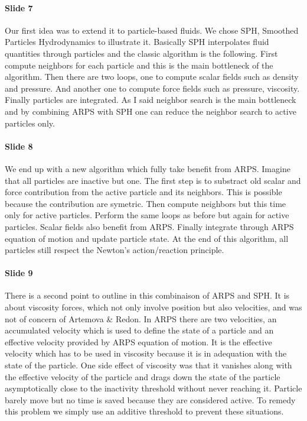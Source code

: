 \documentclass[twocolumn]{article}
\begin{document}
\paragraph{Slide 7}
Our first idea was to extend it to particle-based fluids.
We chose SPH, Smoothed Particles Hydrodynamics to illustrate it.
Basically SPH interpolates fluid quantities through particles and the classic algorithm is the following.
First compute neighbors for each particle and this is the main bottleneck of the algorithm.
Then there are two loops, one to compute scalar fields such as density and pressure.
And another one to compute force fields such as pressure, viscosity.
Finally particles are integrated.
As I said neighbor search is the main bottleneck and by combining ARPS with SPH one can reduce the neighbor search to active particles only.
\paragraph{Slide 8}
We end up with a new algorithm which fully take benefit from ARPS.
Imagine that all particles are inactive but one.
The first step is to substract old scalar and force contribution from the active particle and its neighbors.
This is possible because the contribution are symetric.
Then compute neighbors but this time only for active particles.
Perform the same loops as before but again for active particles.
Scalar fields also benefit from ARPS.
Finally integrate through ARPS equation of motion and update particle state.
At the end of this algorithm, all particles still respect the Newton's action/reaction principle.
\paragraph{Slide 9}
There is a second point to outline in this combinaison of ARPS and SPH.
It is about viscosity forces, which not only involve position but also velocities, and was not of concern of Artemova \& Redon.
In ARPS there are two velocities, an accumulated velocity which is used to define the state of a particle and an effective velocity provided by ARPS equation of motion.
It is the effective velocity which has to be used in viscosity because it is in adequation with the state of the particle.
One side effect of viscosity was that it vanishes along with the effective velocity of the particle and drags down the state of the particle asymptotically close to the inactivity threshold without never reaching it.
Particle barely move but no time is saved because they are considered active.
To remedy this problem we simply use an additive threshold to prevent these situations.
\end{document}
